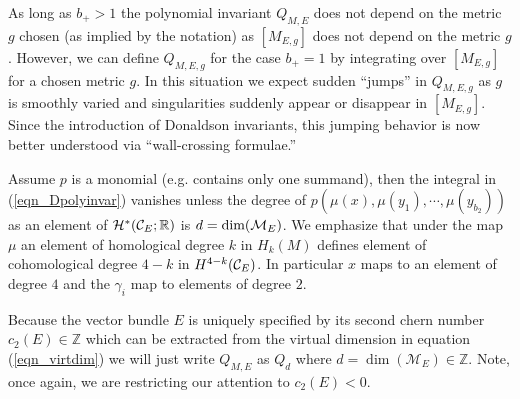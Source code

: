 \documentclass[12pt, onecolumn]{article}
\newenvironment{remark}[1][Remark]{\begin{trivlist}
\item[\hskip \labelsep {\bfseries #1}]}{\end{trivlist}}
\begin{document}
\begin{remark}
As long as $b_{+}>1$ the polynomial invariant $Q_{M,E}$ does not depend on the metric $g$ chosen (as implied by the notation) as $[M_{E,g}]$ does not depend on the metric $g$.  However, we can define $Q_{M,E,g}$ for the case $b_{+} = 1$ by integrating over $[M_{E,g}]$ for a chosen metric $g$.  In this situation we expect sudden ``jumps'' in $Q_{M,E,g}$ as $g$ is smoothly varied and singularities suddenly appear or disappear in $[M_{E,g}]$.  Since the introduction of Donaldson invariants, this jumping behavior is now better understood via ``wall-crossing formulae.''
\end{remark}


\begin{remark} Assume $p$ is a monomial (e.g. contains only one summand), then the integral in (\ref{eqn_Dpolyinvar}) vanishes unless the degree of $p(\mu(x),\mu(y_{1}),\cdots,\mu(y_{b_{2}}))$ as an element of $ {\cal H}^*({\cal C}_{E};\mathbb{R})$ is $d=\text{dim}({\cal M}_{E})$.  We emphasize that under the map $\mu$ an element of homological degree $k$ in $H_{k}(M)$ defines element of cohomological degree $4-k$ in $H^{4-k}({\cal C}_{E})$.  In particular $x$ maps to an element of degree $4$ and the $\gamma_{i}$ map to elements of degree $2$.
\end{remark}

\begin{remark}
Because the vector bundle $E$ is uniquely specified by its second chern number $c_{2}(E) \in \mathbb{Z}$ which can be extracted from the virtual dimension in equation (\ref{eqn_virtdim}) we will just write $Q_{M,E}$ as $Q_{d}$ where $d= \dim(\mathcal{M}_{E}) \in \mathbb{Z}$.  Note, once again, we are restricting our attention to $c_{2}(E)<0$.
\end{remark}
\end{document}
